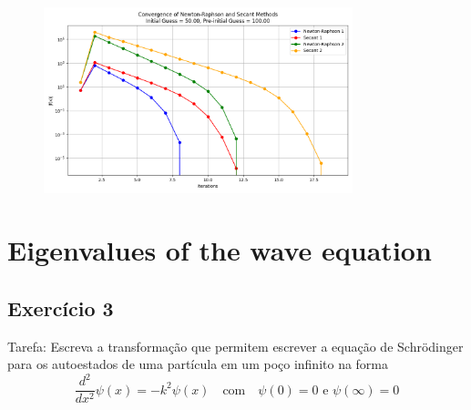 \documentclass[12pt, a4paper]{article} %
\begin{document}
        \begin{figure}[H]
            \centering
            \includegraphics[width=0.8\textwidth]{../images/convergence-initial-500-preinitial-1000.png}
            \caption{}        
        \end{figure}

\section{Eigenvalues of the wave equation}

    \subsection{Exerc\'icio 3}

        Tarefa: Escreva a transforma\c{c}\~ao que permitem escrever a equa\c{c}\~ao de Schr\"odinger para os
        autoestados de uma part\'icula em um po\c{c}o infinito na forma
        \begin{equation}
            \frac{d^2}{dx^2}\psi(x) = -k^2\psi(x) \quad \text{com} \quad \psi(0) = 0 \text{ e } \psi(\infty) = 0
        \end{equation}
\end{document}
